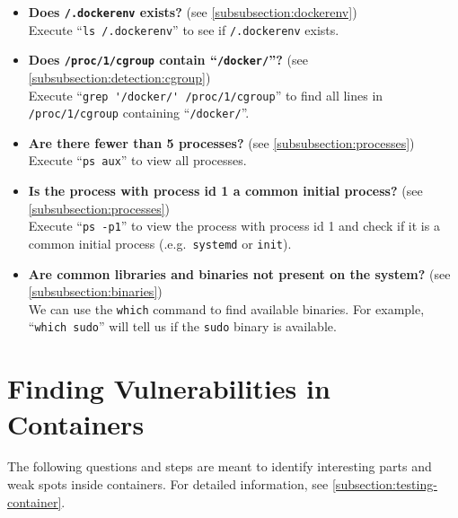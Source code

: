 \begin{itemize}
    \item \textbf{Does \lstinline{/.dockerenv} exists?} (see \autoref{subsubsection:dockerenv})\\
    Execute ``\lstinline{ls /.dockerenv}'' to see if \lstinline{/.dockerenv} exists.

    \item \textbf{Does \lstinline{/proc/1/cgroup} contain ``\lstinline{/docker/}''?} (see \autoref{subsubsection:detection:cgroup})\\
    Execute ``\lstinline{grep '/docker/' /proc/1/cgroup}'' to find all lines in \lstinline{/proc/1/cgroup} containing ``\lstinline{/docker/}''.

    \item \textbf{Are there fewer than 5 processes?} (see \autoref{subsubsection:processes})\\
    Execute ``\lstinline{ps aux}'' to view all processes.

    \item \textbf{Is the process with process id 1 a common initial process?} (see \autoref{subsubsection:processes})\\
        Execute ``\lstinline{ps -p1}'' to view the process with process id 1 and check if it is a common initial process (.e.g.\ \lstinline{systemd} or \lstinline{init}).

    \item \textbf{Are common libraries and binaries not present on the system?} (see \autoref{subsubsection:binaries})\\
    We can use the \lstinline{which} command to find available binaries. For example, ``\lstinline{which sudo}'' will tell us if the \lstinline{sudo} binary is available.
\end{itemize}

\section{Finding Vulnerabilities in Containers}\label{section:checklist-vulnerabilities-container}
The following questions and steps are meant to identify interesting parts and weak spots inside containers. For detailed information, see \autoref{subsection:testing-container}.


